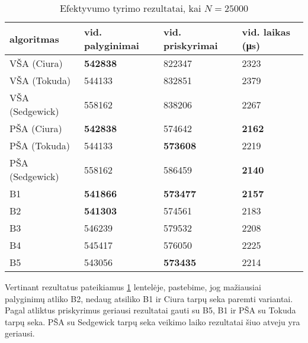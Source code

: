 \documentclass{VUMIFInfKursinis}
\begin{document}
\begin{table}[H]
  \caption{Efektyvumo tyrimo rezultatai, kai $N = 25000$}
  \label{results_25000}
  \centering
  \begin{tabular}{llll}
    algoritmas & vid. palyginimai                        & vid. priskyrimai                        & vid. laikas (μs)                      \\ \midrule
    VŠA (Ciura)       & \cellcolor[HTML]{70AD47}\textbf{542838} & 822347                                  & 2323                                  \\
    VŠA (Tokuda)      & 544133                                  & 832851                                  & 2379                                  \\
    VŠA (Sedgewick)       & 558162                                  & 838206                                  & 2267                                  \\
    PŠA (Ciura) & \cellcolor[HTML]{70AD47}\textbf{542838} & 574642                                  & \cellcolor[HTML]{70AD47}\textbf{2162} \\
    PŠA (Tokuda)      & 544133                                  & \cellcolor[HTML]{70AD47}\textbf{573608} & 2219                                  \\
    PŠA (Sedgewick)      & 558162                                  & 586459                                  & \cellcolor[HTML]{70AD47}\textbf{2140} \\
    B1 & \cellcolor[HTML]{70AD47}\textbf{541866} & \cellcolor[HTML]{70AD47}\textbf{573477} & \cellcolor[HTML]{70AD47}\textbf{2157} \\
    B2      & \cellcolor[HTML]{70AD47}\textbf{541303} & 574561                                  & 2183                                  \\
    B3      & 546239                                  & 579532                                  & 2208                                  \\
    B4      & 545417                                  & 576050                                  & 2225                                  \\ 
    B5      & 543056                                  & \cellcolor[HTML]{70AD47}\textbf{573435} & 2214                                  \\ \bottomrule 
  \end{tabular}
\end{table}

Vertinant rezultatus pateikiamus \ref{results_25000} lentelėje, pastebime, jog
mažiausiai palyginimų atliko B2, nedaug atsiliko B1 ir Ciura tarpų seka paremti variantai.
Pagal atliktus priskyrimus geriausi rezultatai gauti su B5, B1 ir PŠA su Tokuda tarpų seka.
PŠA su Sedgewick tarpų seka veikimo laiko rezultatai šiuo atveju yra geriausi.
\end{document}
